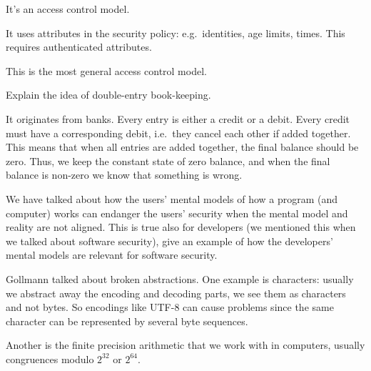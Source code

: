 \begin{solution}
  It's an access control model.

  It uses attributes in the security policy: e.g.\ identities, age limits, 
  times.
  This requires authenticated attributes.

  This is the most general access control model.
\end{solution}


\question[3]\label{q:accountability}
Explain the idea of double-entry book-keeping.

\begin{solution}
  It originates from banks.
  Every entry is either a credit or a debit.
  Every credit must have a corresponding debit, i.e.\ they cancel each other if 
  added together.
  This means that when all entries are added together, the final balance should 
  be zero.
  Thus, we keep the constant state of zero balance, and when the final balance 
  is non-zero we know that something is wrong.
\end{solution}

\question[3]\label{q:software}
We have talked about how the users' mental models of how a program (and
computer) works can endanger the users' security when the mental model and
reality are not aligned.
This is true also for developers (we mentioned this when we talked about
software security), give an example of how the developers' mental models are
relevant for software security.

\begin{solution}
  Gollmann talked about broken abstractions.
  One example is characters: usually we abstract away the encoding and 
  decoding
  parts, we see them as characters and not bytes.
  So encodings like UTF-8 can cause problems since the same character 
  can be
  represented by several byte sequences.

  Another is the finite precision arithmetic that we work with in 
  computers,
  usually congruences modulo \(2^{32}\) or \(2^{64}\).
\end{solution}

